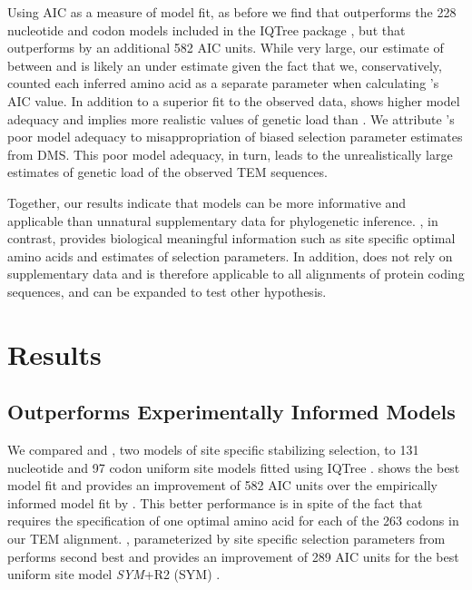Using AIC as a measure of model fit, as before we find that \phydms outperforms the 228 nucleotide and codon models included in the IQTree package \citep{bloom2014, bloom2017}, but that \selac outperforms \phydms by an additional 582 AIC units.
While very large, our estimate of \DeltaAIC between \selac and \phydms is likely an under estimate given the fact that we, conservatively, counted each inferred amino acid as a separate parameter when calculating \selac's AIC value.
In addition to a superior fit to the observed data, \selac shows higher model adequacy and implies more realistic values of genetic load than \phydms.
We attribute \phydms's poor model adequacy to misappropriation of biased selection parameter estimates from DMS. 
This poor model adequacy, in turn, leads to the unrealistically large estimates of genetic load of the observed TEM sequences.

Together, our results indicate that models can be more informative and applicable than unnatural supplementary data for phylogenetic inference.
\selac, in contrast, provides biological meaningful information such as site specific optimal amino acids and estimates of selection parameters.
In addition, \selac does not rely on supplementary data and is therefore applicable to all alignments of protein coding sequences, and can be expanded to test other hypothesis.


\section{Results}
\subsection{\selac Outperforms Experimentally Informed Models}

We compared \selac and \phydms, two models of site specific stabilizing selection, to 131 nucleotide and 97 codon uniform site models fitted using IQTree \citep[][see Table \ref{tab:AIC_selac} for the best performing models and Table \ref{tab:AIC_full} for all models]{nguyen2015}.
\selac shows the best model fit and provides an improvement of 582 AIC units over the empirically informed model fit by \phydms.
This better performance is in spite of the fact that \selac requires the specification of one optimal amino acid for each of the 263 codons in our TEM alignment.
\phydms, parameterized by site specific selection parameters from \citet{stiffler2016} performs second best and provides an improvement of 289 AIC units for the best uniform site model \emph{SYM}+R2 (SYM) \citet{zharkikh1994}. 

